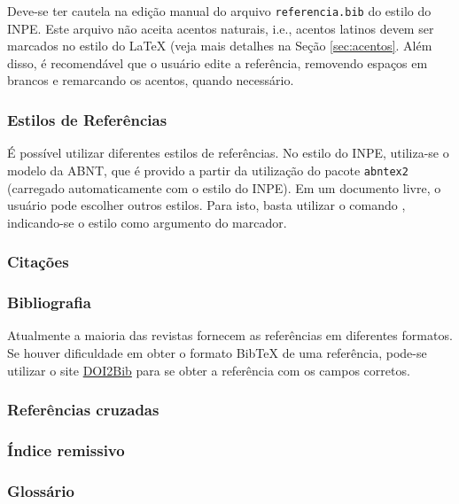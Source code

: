 \begin{marker}
  Deve-se ter cautela na edição manual do arquivo {\tt referencia.bib} do estilo do INPE. Este arquivo não aceita acentos naturais, i.e., acentos latinos devem ser marcados no estilo do LaTeX (veja mais detalhes na Seção \ref{sec:acentos}. Além disso, é recomendável que o usuário edite a referência, removendo espaços em brancos e remarcando os acentos, quando necessário.
\end{marker}

\subsubsection*{Estilos de Referências}
\label{sec:estilos_refs}

É possível utilizar diferentes estilos de referências. No estilo do INPE, utiliza-se o modelo da ABNT, que é provido a partir da utilização do pacote {\tt abntex2} (carregado automaticamente com o estilo do INPE). Em um documento livre, o usuário pode escolher outros estilos. Para isto, basta utilizar o comando \texttt{}, indicando-se o estilo como argumento do marcador.

\subsubsection*{Citações}
\label{sec:cita}

\subsubsection*{Bibliografia}
\label{sec:biblio}

Atualmente a maioria das revistas fornecem as referências em diferentes formatos. Se houver dificuldade em obter o formato BibTeX de uma referência, pode-se utilizar o site \href{https://doi2bib.org}{DOI2Bib} para se obter a referência com os campos corretos.

\subsubsection*{Referências cruzadas}
\label{sec:refs_cruz}

\subsubsection*{Índice remissivo}
\label{sec:ind_rem}

\subsubsection*{Glossário}
\label{sec:glossario}

